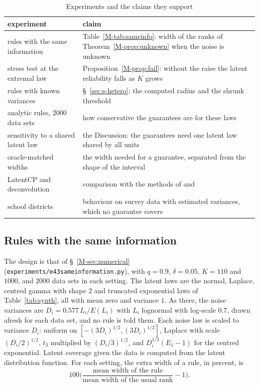 \documentclass[11pt]{article}
\renewcommand{\_}{\usc\allowbreak}
\begin{document}
\begin{table}[h]
\centering
\caption{Experiments and the claims they support}
\label{tab:s-sims}
\footnotesize
\begin{tabular}{>{\raggedright\arraybackslash}p{}>{\raggedright\arraybackslash}p{}}
\toprule
experiment & claim \\
\midrule
rules with the same information & Table~\ref{M-tab:sameinfo}: width of the ranks of Theorem~\ref{M-prop:unknown} when the noise is unknown \\
stress test at the extremal law & Proposition~\ref{M-prop:fail}: without the raise the latent reliability falls as $K$ grows \\
rules with known variances & \S~\ref{sec:s-hetero}: the computed radius and the shrunk threshold \\
analytic rules, $2000$ data sets & how conservative the guarantees are for these laws \\
sensitivity to a shared latent law & the Discussion: the guarantees need one latent law shared by all units \\
oracle-matched widths & the width needed for a guarantee, separated from the shape of the interval \\
LatentCP and deconvolution & comparison with the methods of \citet{zheng2026} and \citet{cohen2025} \\
school districts & behaviour on survey data with estimated variances, which no guarantee covers \\
\bottomrule
\end{tabular}
\end{table}

\subsection*{Rules with the same information}

The design is that of \S~\ref{M-sec:numerical} (\texttt{experiments/e43\_same\_information.py}), with $q = 0.9$, $\delta = 0.05$, $K = 110$ and $1000$, and $2000$ data sets in each setting. The latent laws are the normal, Laplace, centred gamma with shape $2$ and truncated exponential laws of Table~\ref{tab:synth}, all with mean zero and variance $1$. As there, the noise variances are $D_i = 0.577\,L_i/E(L_i)$ with $L_i$ lognormal with log-scale $0.7$, drawn afresh for each data set, and no rule is told them. Each noise law is scaled to variance $D_i$: uniform on $[-(3D_i)^{1/2}, (3D_i)^{1/2}]$, Laplace with scale $(D_i/2)^{1/2}$, $t_3$ multiplied by $(D_i/3)^{1/2}$, and $D_i^{1/2}(E_1 - 1)$ for the centred exponential. Latent coverage given the data is computed from the latent distribution function. For each setting, the extra width of a rule, in percent, is
\[
100\Big(\frac{\text{mean width of the rule}}{\text{mean width of the usual rank}} - 1\Big).
\]
\end{document}
